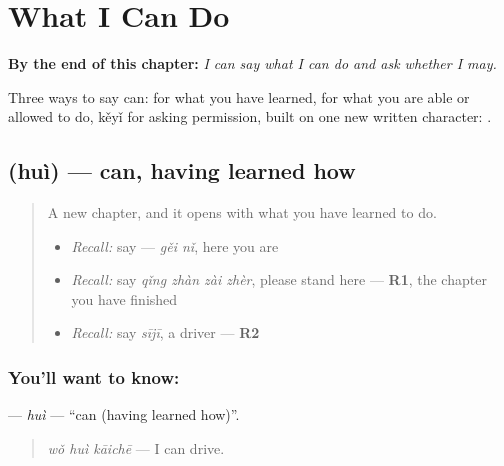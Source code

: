 
\chapter{What I Can Do}
\label{ch:zh-what-i-can-do}

\begin{chapteropening}
\textbf{By the end of this chapter:} \emph{I can say what I can do and ask whether I may.}

Three ways to say can:  for what you have learned,  for what you are able or allowed to do, kěyǐ for asking permission, built on one new written character: .
\end{chapteropening}

\section[\texorpdfstring{\zh{会} (huì)}{会 (huì)}]{ (huì) — can, having learned how}

\label{lesson:ZH-C90-hui}



\begin{quote}
A new chapter, and it opens with what you have learned to do.

\begin{itemize}
\raggedright
  \item \emph{Recall:} say  — \emph{gěi nǐ}, here you are
  \item \emph{Recall:} say \emph{qǐng zhàn zài zhèr}, please stand here — \textbf{R1}, the chapter you have finished
  \item \emph{Recall:} say \emph{sījī}, a driver — \textbf{R2}
\end{itemize}
\end{quote}

\subsection*{You'll want to know: }
\textbf{} — \emph{huì} — \textquotedblleft{}can (having learned how)\textquotedblright{}.

\begin{quote}
\textbf{} \emph{wǒ huì kāichē} — I can drive.
\end{quote}

